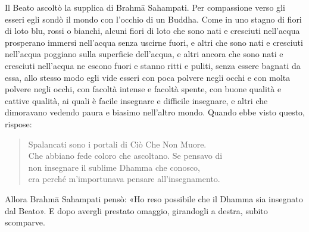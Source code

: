 Il Beato ascoltò la supplica di Brahmā Sahampati. Per compassione verso gli
esseri egli sondò il mondo con l’occhio di un Buddha. Come in uno stagno di
fiori di loto blu, rossi o bianchi, alcuni fiori di loto che sono nati e
cresciuti nell’acqua prosperano immersi nell’acqua senza uscirne fuori, e altri
che sono nati e cresciuti nell’acqua poggiano sulla superficie dell’acqua, e
altri ancora che sono nati e cresciuti nell’acqua ne escono fuori e stanno ritti
e puliti, senza essere bagnati da essa, allo stesso modo egli vide esseri con
poca polvere negli occhi e con molta polvere negli occhi, con facoltà intense e
facoltà spente, con buone qualità e cattive qualità, ai quali è facile insegnare
e difficile insegnare, e altri che dimoravano vedendo paura e biasimo nell’altro
mondo. Quando ebbe visto questo, rispose:

\begin{quote}

  Spalancati sono i portali di Ciò Che Non Muore. \\
  Che abbiano fede coloro che ascoltano.
  Se pensavo di \\
  non insegnare il sublime Dhamma che conosco, \\
  era perché m’importunava pensare all’insegnamento.

\end{quote}

Allora Brahmā Sahampati pensò: «Ho reso possibile che il Dhamma sia insegnato
dal Beato». E dopo avergli prestato omaggio, girandogli a destra, subito
scomparve.

